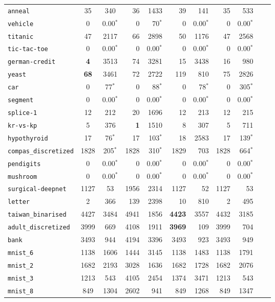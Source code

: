 \begin{tabular}{lccrrrrrrrr}
\texttt{anneal} & 35 & 340 & 36 & 1433 & 39 & 141 & 35 & 533\\
\texttt{vehicle} & 0 & 0.00$^*$ & 0 & 70$^*$ & 0 & 0.00$^*$ & 0 & 0.00$^*$\\
\texttt{titanic} & 47 & 2117 & 66 & 2898 & 50 & 1176 & 47 & 2568\\
\texttt{tic-tac-toe} & 0 & 0.00$^*$ & 0 & 0.00$^*$ & 0 & 0.00$^*$ & 0 & 0.00$^*$\\
\texttt{german-credit} & \textbf{4} & 3513 & 74 & 3281 & 15 & 3438 & 16 & 980\\
\texttt{yeast} & \textbf{68} & 3461 & 72 & 2722 & 119 & 810 & 75 & 2826\\
\texttt{car} & 0 & 77$^*$ & 0 & 88$^*$ & 0 & 78$^*$ & 0 & 305$^*$\\
\texttt{segment} & 0 & 0.00$^*$ & 0 & 0.00$^*$ & 0 & 0.00$^*$ & 0 & 0.00$^*$\\
\texttt{splice-1} & 12 & 212 & 20 & 1696 & 12 & 213 & 12 & 215\\
\texttt{kr-vs-kp} & 5 & 376 & \textbf{1} & 1510 & 8 & 307 & 5 & 711\\
\texttt{hypothyroid} & 17 & 76$^*$ & 17 & 103$^*$ & 18 & 2583 & 17 & 139$^*$\\
\texttt{compas\_discretized} & 1828 & 205$^*$ & 1828 & 310$^*$ & 1829 & 703 & 1828 & 664$^*$\\
\texttt{pendigits} & 0 & 0.00$^*$ & 0 & 0.00$^*$ & 0 & 0.00$^*$ & 0 & 0.00$^*$\\
\texttt{mushroom} & 0 & 0.00$^*$ & 0 & 0.00$^*$ & 0 & 0.00$^*$ & 0 & 0.00$^*$\\
\texttt{surgical-deepnet} & 1127 & 53 & 1956 & 2314 & 1127 & 52 & 1127 & 53\\
\texttt{letter} & 2 & 366 & 139 & 2398 & 10 & 810 & 2 & 495\\
\texttt{taiwan\_binarised} & 4427 & 3484 & 4941 & 1856 & \textbf{4423} & 3557 & 4432 & 3185\\
\texttt{adult\_discretized} & 3999 & 669 & 4108 & 1911 & \textbf{3969} & 109 & 3999 & 704\\
\texttt{bank} & 3493 & 944 & 4194 & 3396 & 3493 & 923 & 3493 & 949\\
\texttt{mnist\_6} & 1138 & 1606 & 1444 & 3145 & 1138 & 1483 & 1138 & 1791\\
\texttt{mnist\_2} & 1682 & 2193 & 3028 & 1636 & 1682 & 1728 & 1682 & 2076\\
\texttt{mnist\_3} & 1213 & 543 & 4105 & 2454 & 1374 & 3471 & 1213 & 543\\
\texttt{mnist\_8} & 849 & 1304 & 2602 & 941 & 849 & 1268 & 849 & 1347\\

\end{tabular}
